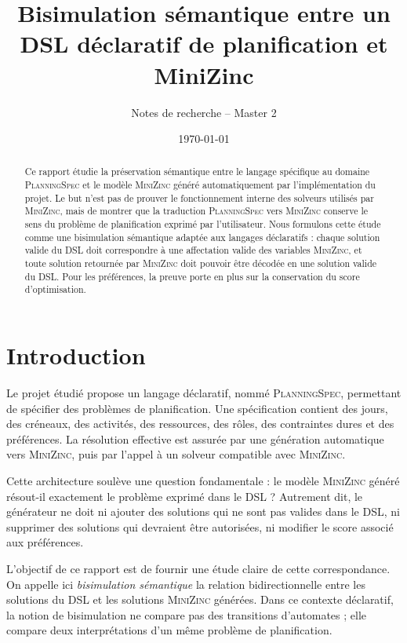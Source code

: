 \documentclass[12pt,a4paper]{article}
\title{Bisimulation sémantique entre un DSL déclaratif de planification et MiniZinc}
\author{Notes de recherche -- Master 2}
\date{\today}
\newcommand{\DSL}{\textsc{PlanningSpec}}
\newcommand{\MZN}{\textsc{MiniZinc}}
\begin{document}
\maketitle

\begin{abstract}
Ce rapport étudie la préservation sémantique entre le langage spécifique au domaine \DSL{} et le modèle \MZN{} généré automatiquement par l'implémentation du projet. Le but n'est pas de prouver le fonctionnement interne des solveurs utilisés par \MZN{}, mais de montrer que la traduction \DSL{} vers \MZN{} conserve le sens du problème de planification exprimé par l'utilisateur. Nous formulons cette étude comme une bisimulation sémantique adaptée aux langages déclaratifs : chaque solution valide du DSL doit correspondre à une affectation valide des variables \MZN{}, et toute solution retournée par \MZN{} doit pouvoir être décodée en une solution valide du DSL. Pour les préférences, la preuve porte en plus sur la conservation du score d'optimisation.
\end{abstract}

\tableofcontents
\newpage

\section{Introduction}

Le projet étudié propose un langage déclaratif, nommé \DSL{}, permettant de spécifier des problèmes de planification. Une spécification contient des jours, des créneaux, des activités, des ressources, des rôles, des contraintes dures et des préférences. La résolution effective est assurée par une génération automatique vers \MZN{}, puis par l'appel à un solveur compatible avec \MZN{}.

Cette architecture soulève une question fondamentale : le modèle \MZN{} généré résout-il exactement le problème exprimé dans le DSL ? Autrement dit, le générateur ne doit ni ajouter des solutions qui ne sont pas valides dans le DSL, ni supprimer des solutions qui devraient être autorisées, ni modifier le score associé aux préférences.

L'objectif de ce rapport est de fournir une étude claire de cette correspondance. On appelle ici \emph{bisimulation sémantique} la relation bidirectionnelle entre les solutions du DSL et les solutions \MZN{} générées. Dans ce contexte déclaratif, la notion de bisimulation ne compare pas des transitions d'automates ; elle compare deux interprétations d'un même problème de planification.
\end{document}
